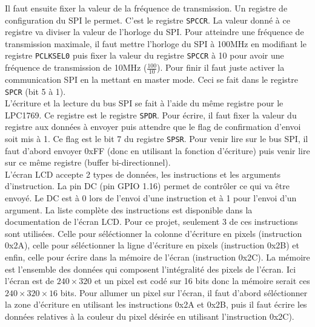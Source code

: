 \documentclass[a4paper]{article}
\begin{document}
Il faut ensuite fixer la valeur de la fréquence de transmission. Un registre de configuration du
SPI le permet. C'est le registre \texttt{SPCCR}. La valeur
donné à ce registre va diviser la valeur de l'horloge du SPI. Pour atteindre
une fréquence de transmission maximale, il faut mettre l'horloge du SPI à 100MHz
en modifiant le registre \texttt{PCLKSEL0} puis fixer la valeur du registre
\texttt{SPCCR} à 10 pour avoir une fréquence de transmission de 10MHz ($\frac{100}{10}$).
Pour finir il faut juste activer la communication SPI en la mettant en master mode.
Ceci se fait dans le registre \texttt{SPCR} (bit 5 à 1). \\

L'écriture et la lecture du bus SPI se fait à l'aide du même registre pour le
LPC1769. Ce registre est le registre  \texttt{SPDR}. Pour écrire,
il faut fixer la valeur du registre aux données à envoyer puis attendre que le flag
de confirmation d'envoi soit mis à 1. Ce flag est le bit 7 du registre \texttt{SPSR}.
\newline
Pour venir lire sur le bus SPI, il faut d'abord envoyer 0xFF (donc en utilisant
la fonction d'écriture) puis venir lire sur ce même registre (buffer bi-directionnel). \\

L'écran LCD accepte 2 types de données, les instructions et les arguments
d'instruction. La pin DC (pin GPIO 1.16) permet de contrôler ce qui va être envoyé.
Le DC est à 0 lors de l'envoi d'une instruction et à 1 pour l'envoi d'un argument.
La liste complète des instructions est disponible dans la documentation de l'écran
LCD. Pour ce projet, seulement 3 de ces instructions sont utilisées. Celle pour séléctionner
la colonne d'écriture en pixels (instruction 0x2A), celle pour séléctionner la ligne
d'écriture en pixels (instruction 0x2B) et enfin, celle pour écrire dans la mémoire
de l'écran (instruction 0x2C). La mémoire est l'ensemble des données qui composent
l'intégralité des pixels de l'écran. Ici l'écran est de $240 \times 320$ et un pixel
est codé sur 16 bits donc la mémoire serait ces $240 \times 320 \times 16$ bits.
Pour allumer un pixel sur l'écran, il faut d'abord séléctionner la zone d'écriture
en utilisant les instructions 0x2A et 0x2B, puis il faut écrire les données relatives 
à la couleur du pixel désirée en utilisant l'instruction 0x2C).
\end{document}
